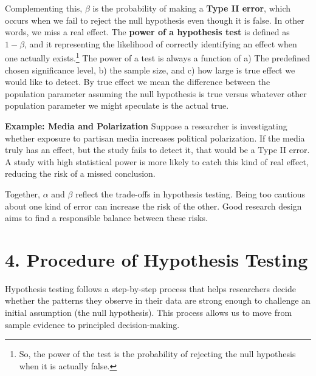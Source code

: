 \documentclass[12pt]{article}
\begin{document}
Complementing this, $\beta$ is the probability of making a \textbf{Type II error}, which occurs when we fail to reject the null hypothesis even though it is false. In other words, we miss a real effect. The \textbf{power of a hypothesis test} is defined as $1 - \beta$, and it representing the likelihood of correctly identifying an effect when one actually exists.\footnote{So, the power of the test is the probability of rejecting the null hypothesis when it is actually false.} The power of a test is always a function of a) The predefined chosen significance level, b) the sample size, and c) how large is true effect we would like to detect. By true effect we mean the difference between the population parameter assuming the null hypothesis is true versus whatever other population parameter we might speculate is the actual true.

\textbf{Example: Media and Polarization}
Suppose a researcher is investigating whether exposure to partisan media increases political polarization. If the media truly has an effect, but the study fails to detect it, that would be a Type II error. A study with high statistical power is more likely to catch this kind of real effect, reducing the risk of a missed conclusion.

Together, $\alpha$ and $\beta$ reflect the trade-offs in hypothesis testing. Being too cautious about one kind of error can increase the risk of the other. Good research design aims to find a responsible balance between these risks.


\section*{4. Procedure of Hypothesis Testing}

Hypothesis testing follows a step-by-step process that helps researchers decide whether the patterns they observe in their data are strong enough to challenge an initial assumption (the null hypothesis). This process allows us to move from sample evidence to principled decision-making.
\end{document}
